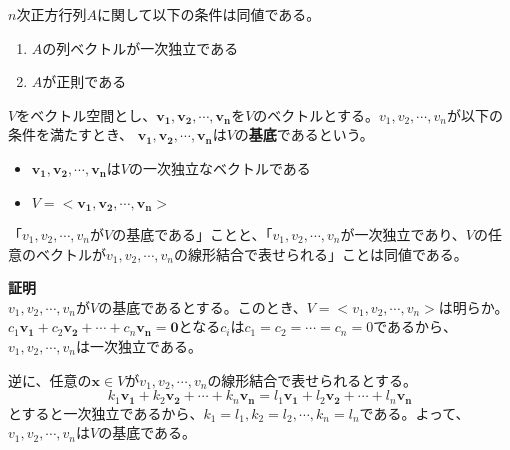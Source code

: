 \documentclass{jlreq}
\begin{document}
\begin{theorembox}[一次独立と同値な条件]
  $n$次正方行列$A$に関して以下の条件は同値である。
  \begin{enumerate}
    \item $A$の列ベクトルが一次独立である
    \item $A$が正則である
  \end{enumerate}
\end{theorembox}

\begin{definitionbox}[基底]
  $V$をベクトル空間とし、$\boldsymbol{v_1}, \boldsymbol{v_2}, \cdots, \boldsymbol{v_n}$を$V$のベクトルとする。$v_1, v_2, \cdots, v_n$が以下の条件を満たすとき、 $\boldsymbol{v_1}, \boldsymbol{v_2}, \cdots, \boldsymbol{v_n}$は$V$の\textbf{基底}であるという。
  \begin{itemize}
    \item $\boldsymbol{v_1}, \boldsymbol{v_2}, \cdots, \boldsymbol{v_n}$は$V$の一次独立なベクトルである
    \item $V = <\boldsymbol{v_1}, \boldsymbol{v_2}, \cdots, \boldsymbol{v_n}>$
  \end{itemize}
\end{definitionbox}

\begin{theorembox}[定理3]
  「$v_1, v_2, \cdots, v_n$が$V$の基底である」ことと、「$v_1, v_2, \cdots, v_n$が一次独立であり、$V$の任意のベクトルが$v_1, v_2, \cdots, v_n$の線形結合で表せられる」ことは同値である。

  \dotfill

  \textbf{証明} \\

  $v_1, v_2, \cdots, v_n$が$V$の基底であるとする。このとき、$V = <v_1, v_2, \cdots, v_n>$は明らか。
  $c_1 \boldsymbol{v_1} + c_2 \boldsymbol{v_2} + \cdots + c_n \boldsymbol{v_n} = \boldsymbol{0}$となる$c_i$は$c_1 = c_2 = \cdots = c_n = 0$であるから、$v_1, v_2, \cdots, v_n$は一次独立である。

  逆に、任意の$\boldsymbol{x} \in V$が$v_1, v_2, \cdots, v_n$の線形結合で表せられるとする。
  \begin{equation*}
    k_1 \boldsymbol{v_1} + k_2 \boldsymbol{v_2} + \cdots + k_n \boldsymbol{v_n} = l_1 \boldsymbol{v_1} + l_2 \boldsymbol{v_2} + \cdots + l_n \boldsymbol{v_n}
  \end{equation*}
  とすると一次独立であるから、$k_1 = l_1, k_2 = l_2, \cdots, k_n = l_n$である。よって、$v_1, v_2, \cdots, v_n$は$V$の基底である。
\end{theorembox}
\end{document}

